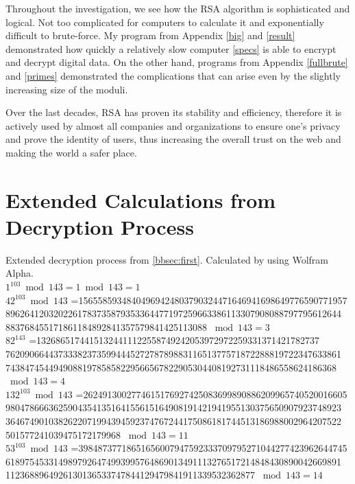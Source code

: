 \documentclass[a4paper, 12pt]{article}
\begin{document}
Throughout the investigation, we see how the RSA algorithm is sophisticated and logical. Not too complicated for computers to calculate it and exponentially difficult to brute-force. My program from Appendix \ref{big} and \ref{result} demonstrated how quickly a relatively slow computer \ref{specs} is able to encrypt and decrypt digital data. On the other hand, programs from Appendix \ref{fullbrute} and \ref{primes} demonstrated the complications that can arise even by the slightly increasing size of the moduli.

Over the last decades, RSA has proven its stability and efficiency, therefore it is actively used by almost all companies and organizations to ensure one's privacy and prove the identity of users, thus increasing the overall trust on the web and making the world a safer place.\\ 

\newpage
\singlespace
\appendix
\section{Extended Calculations from Decryption Process}
\label{calc}
Extended decryption process from \ref{bbsec:first}. Calculated by using Wolfram Alpha.\cite{wa}\\

$1^{103} \bmod 143 =1 \bmod 143 = 1$\\

  $42 ^{103} \bmod 143$ =15655859348404969424803790324471646941698649776590771957
8962641203202261783735879353364477197259663386113307908088797795612644
883768455171861184892841357579841425113088 $\bmod 143 = 3$\\

$82 ^ {143}$ =13268651744151324411122558749242053972972259331371421782737
7620906644373338237359944452727878988311651377571872288819722347633861
743847454494908819785858229566567822905304408192731118486558624186368
$\bmod 143 = 4$\\

$132^ {103} \bmod 143$ =2624913002774615176927425083699890886209965740520016605
9804786663625904354135164155615164908191421941955130375650907923748923
3646749010382622071994394592374767244175086181744513186988002964207522
501577241039475172179968 $\bmod 143 = 11$\\

$53^ {103} \bmod 143$ =39848737718651656007947592333709795271044277423962644745
6189754533149897926474993995764869013491113276517214848430890042669891
1123688964926130136533747844129479841911339532362877 $\bmod 143 = 14$\\
\end{document}
